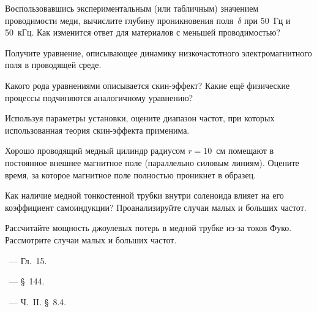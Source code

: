 \begin{lab:questions}
\item Воспользовавшись экспериментальным (или табличным) значением
проводимости меди, вычислите глубину проникновения поля~$\delta$
при 50~Гц и 50~кГц. Как изменится ответ для материалов с меньшей
проводимостью?

\item Получите уравнение, описывающее динамику низкочастотного электромагнитного
поля в проводящей среде.

\item Какого рода уравнениями описывается скин-эффект? Какие ещё физические
процессы подчиняются аналогичному уравнению?

\item Используя параметры установки, оцените диапазон частот,
при которых использованная теория скин-эффекта применима.

\item Хорошо проводящий медный цилиндр радиусом $r=10$~см помещают в постоянное внешнее магнитное поле
(параллельно силовым линиям). Оцените время, за которое магнитное поле полностью проникнет в образец.

\item Как наличие медной тонкостенной трубки внутри соленоида влияет
на его коэффициент самоиндукции?
Проанализируйте случаи малых и больших частот.

\item Рассчитайте мощность джоулевых потерь в медной трубке из-за токов Фуко.
Рассмотрите случаи малых и больших частот.
%

%
%

\end{lab:questions}


\begin{lab:literature}
\item \Kirichenko~--- Гл.~15.

\item \SivuhinIII~--- \S~144.

\item \KingLokOlh~--- Ч.~II. \S~8.4.
\end{lab:literature}
